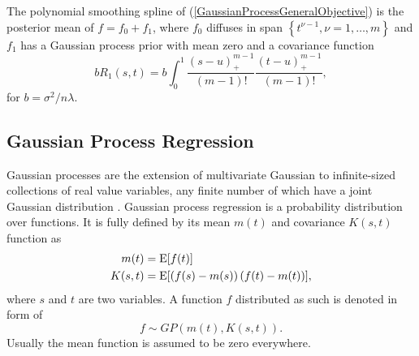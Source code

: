 \begin{theorem}\cite{gu2013smoothing}
The polynomial smoothing spline of (\ref{GaussianProcessGeneralObjective}) is the posterior mean of $f = f_0 +f_1$, where $f_0$ diffuses in span $\left\lbrace t^{\nu-1}, \nu= 1, \ldots , m\right\rbrace$ and $f_1$ has a Gaussian process prior with mean zero and a covariance function
\begin{equation*}
bR_1(s,t) = b\int_{0}^{1} \frac{\left(s-u\right)_+^{m-1}}{(m-1)!} \frac{\left(t-u\right)_+^{m-1}}{(m-1)!},
\end{equation*}
for $b=\sigma^2/n\lambda$. 
\end{theorem}



\subsection{Gaussian Process Regression}

Gaussian processes are the extension of multivariate Gaussian to infinite-sized collections of real value variables, any finite number of which have a joint Gaussian distribution \cite{rasmussen2006gaussian}. Gaussian process regression is a probability distribution over functions. It is fully defined by its mean $m(t)$ and covariance $K(s,t)$ function as 
\begin{align*}
m(t)&=\mathrm{E} \lbrack f(t)\rbrack \\
K(s,t)&=\mathrm{E} \lbrack \left(f(s)-m(s)\right) \left(f(t)-m(t)\right)\rbrack,
\end{align*}
where $s$ and $t$ are two variables. A function $f$ distributed as such is denoted in form of 
\begin{equation*}
f \sim GP\left(m(t),K(s,t) \right).
\end{equation*}
Usually the mean function is assumed to be zero everywhere. 

